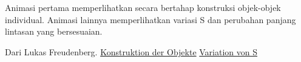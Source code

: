 Animasi pertama memperlihatkan secara bertahap konstruksi objek-objek individual. Animasi lainnya memperlihatkan variasi S dan perubahan panjang lintasan yang bersesuaian.

Dari Lukas Freudenberg.
\href{https://commons.wikimedia.org/wiki/File:Aufgabe75.22.1.gif}{Konstruktion der Objekte}
\href{https://commons.wikimedia.org/wiki/File:Aufgabe75.22.2.gif}{Variation von S}
